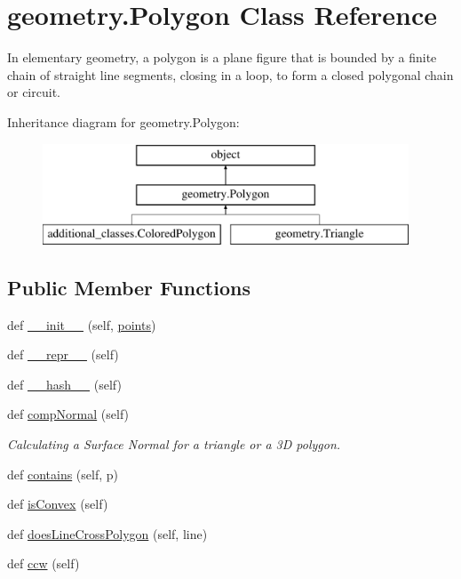 \hypertarget{classgeometry_1_1Polygon}{}\section{geometry.\+Polygon Class Reference}
\label{classgeometry_1_1Polygon}


In elementary geometry, a polygon is a plane figure that is bounded by a finite chain of straight line segments, closing in a loop, to form a closed polygonal chain or circuit.  


Inheritance diagram for geometry.\+Polygon\+:\begin{figure}[H]
\begin{center}
\leavevmode
\includegraphics[height=3.000000cm]{classgeometry_1_1Polygon}
\end{center}
\end{figure}
\subsection*{Public Member Functions}
\begin{DoxyCompactItemize}
\item 
def \hyperlink{classgeometry_1_1Polygon_a46b21b7c846c26d6ff1171cc9a29d0c5}{\+\_\+\+\_\+init\+\_\+\+\_\+} (self, \hyperlink{classgeometry_1_1Polygon_aa0fda1ff74a09b8498bd7d8731b2fbf1}{points})
\item 
def \hyperlink{classgeometry_1_1Polygon_a9c05f0f70dbb5652e29265671b036c71}{\+\_\+\+\_\+repr\+\_\+\+\_\+} (self)
\item 
def \hyperlink{classgeometry_1_1Polygon_ac597f93df5686912dc1ca6eddc65b6b8}{\+\_\+\+\_\+hash\+\_\+\+\_\+} (self)
\item 
def \hyperlink{classgeometry_1_1Polygon_aa39e7d0353ffad956679321aca725d35}{comp\+Normal} (self)
\begin{DoxyCompactList}\small\item\em Calculating a Surface Normal for a triangle or a 3D polygon. \end{DoxyCompactList}\item 
def \hyperlink{classgeometry_1_1Polygon_a64880abb26797d5ad564a6f0399b216c}{contains} (self, p)
\item 
def \hyperlink{classgeometry_1_1Polygon_a4836c37e04dc0eb76809904538b77e7c}{is\+Convex} (self)
\item 
def \hyperlink{classgeometry_1_1Polygon_ae4ab82f837783f51b39a41427e46f5df}{does\+Line\+Cross\+Polygon} (self, line)
\item 
def \hyperlink{classgeometry_1_1Polygon_a4c6914db65978bbd2232f28bbb41b69b}{ccw} (self)
\end{DoxyCompactItemize}

